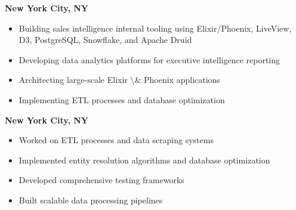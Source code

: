 {\hfill \textbf{New York City, NY}}
\begin{itemize}[leftmargin=*, itemsep=0pt, parsep=0pt, topsep=0pt]
    \item Building sales intelligence internal tooling using Elixir/Phoenix, LiveView, D3, PostgreSQL, Snowflake, and Apache Druid
    \item Developing data analytics platforms for executive intelligence reporting
    \item Architecting large-scale Elixir \textbackslash{}& Phoenix applications
    \item Implementing ETL processes and database optimization
\end{itemize}
\vspace{0.5em}

{\hfill \textbf{New York City, NY}}
\begin{itemize}[leftmargin=*, itemsep=0pt, parsep=0pt, topsep=0pt]
    \item Worked on ETL processes and data scraping systems
    \item Implemented entity resolution algorithms and database optimization
    \item Developed comprehensive testing frameworks
    \item Built scalable data processing pipelines
\end{itemize}
\vspace{0.5em}

